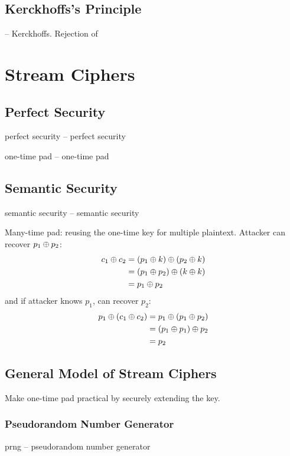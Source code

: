\documentclass[draft]{article}
\begin{document}
\subsection{Kerckhoffs’s Principle}
 -- \glsdesc*{Kerckhoffs}. Rejection of 
\section{Stream Ciphers}
\subsection{Perfect Security}
\begin{multicols}{2}
    \Gls{perfect security} -- \glsdesc*{perfect security}

    \Gls{one-time pad} -- \glsdesc*{one-time pad}
\end{multicols}
\subsection{Semantic Security}
\Gls{semantic security} -- \glsdesc*{semantic security}
\begin{multicols}{2}
    Many-time pad: reusing the one-time key for multiple plaintext. Attacker can recover $p_1 \oplus p_2$:
    \begin{align*}c_1 \oplus c_2
         & = (p_1 \oplus k) \oplus (p_2 \oplus k) \\
         & = (p_1 \oplus p_2) \oplus (k \oplus k) \\
         & = p_1 \oplus p_2
    \end{align*}
    and if attacker knows $p_1$, can recover $p_2$:
    \begin{align*}p_1 \oplus (c_1 \oplus c_2)
         & = p_1 \oplus (p_1 \oplus p_2) \\
         & = (p_1 \oplus p_1) \oplus p_2 \\
         & = p_2
    \end{align*}
\end{multicols}
\subsection{General Model of Stream Ciphers}
Make one-time pad practical by securely extending the key.
\subsubsection*{Pseudorandom Number Generator}
\acrfull{prng} -- \glsdesc*{pseudorandom number generator}
\end{document}
